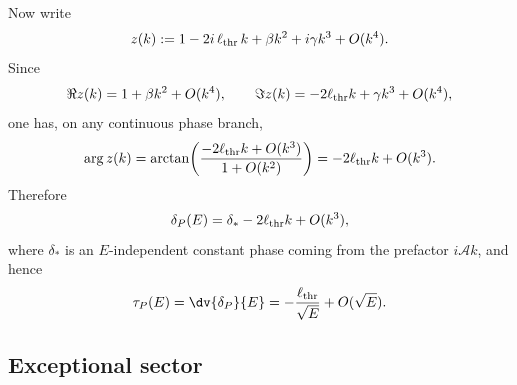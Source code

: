 \documentclass[aps,pra,preprint,notitlepage,nofootinbib]{revtex4-2}
\begin{document}
Now write
\begin{equation}
z(k):=
1-2i\,\ell_{\rm thr}\,k+\beta k^2+i\gamma k^3+O(k^4).
\end{equation}
Since
\begin{equation}
\Re z(k)=1+\beta k^2+O(k^4),
\qquad
\Im z(k)=-2\ell_{\rm thr}k+\gamma k^3+O(k^4),
\end{equation}
one has, on any continuous phase branch,
\begin{equation}
\arg z(k)
=
\arctan\!\left(
\frac{-2\ell_{\rm thr}k+O(k^3)}{1+O(k^2)}
\right)
=
-2\ell_{\rm thr}k+O(k^3).
\label{eq:argz-generic}
\end{equation}
Therefore
\begin{equation}
\delta_P(E)
=
\delta_* -2\ell_{\rm thr}k+O(k^3),
\label{eq:delta-generic-app}
\end{equation}
where $\delta_*$ is an $E$-independent constant phase coming from the prefactor $i\mathcal A k$, and hence
\begin{equation}
\tau_P(E)=\dv{\delta_P}{E}
=
-\frac{\ell_{\rm thr}}{\sqrt E}+O(\sqrt E).
\label{eq:tau-generic-app}
\end{equation}

\subsection{Exceptional sector}
\end{document}
